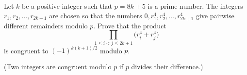 Let $k$ be a positive integer such that $p = 8k + 5$ is a prime number. The integers $r_1, r_2, \dots, r_{2k+1}$ are chosen so that the numbers $0, r_1^4, r_2^4, \dots, r_{2k+1}^4$ give pairwise different remainders modulo $p$. Prove that the product\[\prod_{1 \leqslant i < j \leqslant 2k+1} \big(r_i^4 + r_j^4\big)\]is congruent to $(-1)^{k(k+1)/2}$ modulo $p$.

(Two integers are congruent modulo $p$ if $p$ divides their difference.)
